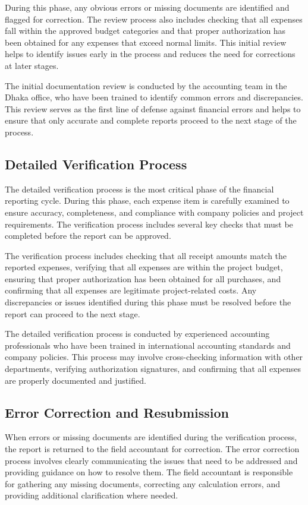 During this phase, any obvious errors or missing documents are identified and flagged for correction. The review process also includes checking that all expenses fall within the approved budget categories and that proper authorization has been obtained for any expenses that exceed normal limits. This initial review helps to identify issues early in the process and reduces the need for corrections at later stages.

The initial documentation review is conducted by the accounting team in the Dhaka office, who have been trained to identify common errors and discrepancies. This review serves as the first line of defense against financial errors and helps to ensure that only accurate and complete reports proceed to the next stage of the process.

\subsection{Detailed Verification Process}
The detailed verification process is the most critical phase of the financial reporting cycle. During this phase, each expense item is carefully examined to ensure accuracy, completeness, and compliance with company policies and project requirements. The verification process includes several key checks that must be completed before the report can be approved.

The verification process includes checking that all receipt amounts match the reported expenses, verifying that all expenses are within the project budget, ensuring that proper authorization has been obtained for all purchases, and confirming that all expenses are legitimate project-related costs. Any discrepancies or issues identified during this phase must be resolved before the report can proceed to the next stage.

The detailed verification process is conducted by experienced accounting professionals who have been trained in international accounting standards and company policies. This process may involve cross-checking information with other departments, verifying authorization signatures, and confirming that all expenses are properly documented and justified.

\subsection{Error Correction and Resubmission}
When errors or missing documents are identified during the verification process, the report is returned to the field accountant for correction. The error correction process involves clearly communicating the issues that need to be addressed and providing guidance on how to resolve them. The field accountant is responsible for gathering any missing documents, correcting any calculation errors, and providing additional clarification where needed.

